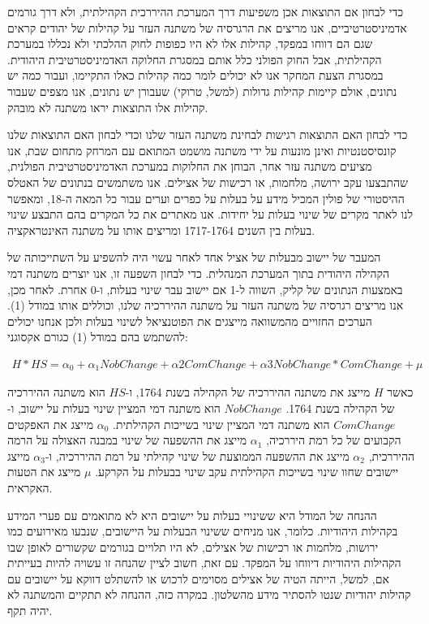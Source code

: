 כדי לבחון אם התוצאות אכן משפיעות דרך המערכת ההיררכית הקהילתית, ולא דרך גורמים אדמיניסטרטיביים, אנו מריצים את הרגרסיה של משתנה העזר על קהילות של יהודים קראים שגם הם דווחו במפקד, קהילות אלו לא היו כפופות לחוק ההלכתי ולא נכללו במערכת הקהילתית, אבל החוק הפולני כלל אותם במסגרת החלוקה האדמיניסטרטיבית היהודית. במסגרת הצעת המחקר אנו לא יכולים לומר כמה קהילות כאלו התקיימו, ועבור כמה יש נתונים, אולם קיימות קהילות גדולות (למשל, טרוקי) שעבורן יש נתונים, אנו מצפים שעבור קהילות אלו התוצאות יראו משתנה לא מובהק.


כדי לבחון האם התוצאות רגישות לבחינת משתנה העזר שלנו וכדי לבחון האם התוצאות שלנו קונסיסטנטיות ואינן מונעות על ידי משתנה מושמט המתואם עם המרחק מתחום שבת, אנו מציעים משתנה עזר אחר, הבוחן את החלוקות במערכת האדמיניסטרטיבית הפולנית, שהתבצעו עקב ירושה, מלחמות, או רכישות של אצילים. אנו משתמשים בנתונים של האטלס ההיסטורי של פולין המכיל מידע על בעלות על כפרים וערים עבור כל המאה ה-18, ומאפשר לנו לאתר מקרים של שינוי בעלות על יחידות. אנו מאתרים את כל המקרים בהם התבצע שינוי בעלות בין השנים 1717-1764 ומריצים אותו על משתנה האינטראקציה.

המעבר של יישוב מבעלות של אציל אחד לאחר עשוי היה להשפיע על השתייכותה של הקהילה היהודית בתוך המערכת המנהלית. כדי לבחון השפעה זו, אנו יוצרים משתנה דמי באמצעות הנתונים של קליק, השווה ל-1 אם יישוב עבר שינוי בעלות, ו-0 אחרת. לאחר מכן, אנו מריצים רגרסיה של משתנה העזר על משתנה ההיררכיה שלנו, וכוללים אותו במודל (1). הערכים החזויים מהמשוואה מייצגים את הפוטנציאל לשינוי בעלות ולכן אנחנו יכולים להשתמש בהם במודל (1) כגורם אקסוגני:

\begin{align}
H*HS= \alpha_0 + \alpha_1 NobChange +\alpha2 ComChange +\alpha3 NobChange * ComChange + \mu
\end{align}

כאשר $H$ מייצג את משתנה ההיררכיה של הקהילה בשנת 1764, ו-$HS$ הוא משתנה ההיררכיה של הקהילה בשנת 1764. $NobChange$ הוא משתנה דמי המציין שינוי בעלות על יישוב, ו-$ComChange$ הוא משתנה דמי המציין שינוי בשייכות הקהילתית. $\alpha_0$ מייצג את האפקטים הקבועים של כל רמת היררכיה, $\alpha_1$ מייצג את ההשפעה של שינוי במבנה האצולה על הרמה ההיררכית, $\alpha_2$ מייצג את ההשפעה הממוצעת של שינוי קהילתי על רמת ההיררכיה, ו-$\alpha_3$ מייצג יישובים שחוו שינוי בשייכות הקהילתית עקב שינוי בבעלות על הקרקע. $\mu$ מייצג את הטעות האקראית.

ההנחה של המודל היא ששינויי בעלות על יישובים היא לא מתואמים עם פערי המידע בקהילות היהודיות. כלומר, אנו מניחים ששינוי הבעלות על היישובים, שנבעו מאירועים כמו ירושות, מלחמות או רכישות של אצילים, לא היו תלויים בגורמים שקשורים לאופן שבו הקהילות היהודיות דיווחו על המפקד.  עם זאת, חשוב לציין שהנחה זו עשויה להיות בעייתית אם, למשל, הייתה הטיה של אצילים מסוימים לרכוש או להשתלט דווקא על יישובים עם קהילות יהודיות שנטו להסתיר מידע מהשלטון. במקרה כזה, ההנחה לא תתקיים והמשתנה לא יהיה תקף.




